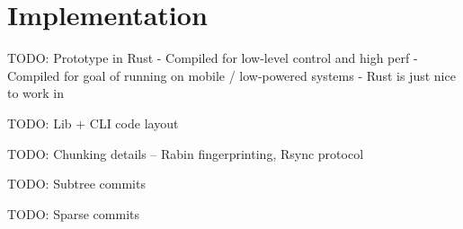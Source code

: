 \chapter{Implementation}

TODO: Prototype in Rust
    - Compiled for low-level control and high perf
    - Compiled for goal of running on mobile / low-powered systems
    - Rust is just nice to work in

TODO: Lib + CLI code layout

TODO: Chunking details -- Rabin fingerprinting, Rsync protocol

TODO: Subtree commits

TODO: Sparse commits

